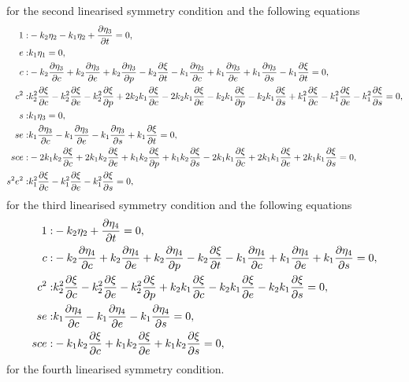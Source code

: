 for the second linearised symmetry condition and the following equations
\begin{align}
1:&- k_{2} \eta_2 - k_{1} \eta_2 + \pdv{\eta_3}{t}=0,\\
e:&k_{1} \eta_1=0,\\
c:&- k_{2} \pdv{\eta_3}{c} + k_{2} \pdv{\eta_3}{e} + k_{2} \pdv{\eta_3}{p} - k_{2} \pdv{\xi}{t} - k_{1} \pdv{\eta_3}{c} + k_{1} \pdv{\eta_3}{e} + k_{1} \pdv{\eta_3}{s} - k_{1} \pdv{\xi}{t}=0,\\
c^{2}:&k_{2}^{2} \pdv{\xi}{c} - k_{2}^{2} \pdv{\xi}{e} - k_{2}^{2} \pdv{\xi}{p} + 2 k_{2} k_{1} \pdv{\xi}{c} - 2 k_{2} k_{1} \pdv{\xi}{e} - k_{2} k_{1} \pdv{\xi}{p} - k_{2} k_{1} \pdv{\xi}{s} + k_{1}^{2} \pdv{\xi}{c} - k_{1}^{2} \pdv{\xi}{e} - k_{1}^{2} \pdv{\xi}{s}=0,\\
s:&k_{1} \eta_3=0,\\
s e:&k_{1} \pdv{\eta_3}{c} - k_{1} \pdv{\eta_3}{e} - k_{1} \pdv{\eta_3}{s}+ k_{1} \pdv{\xi}{t}=0,\\
s c e:&- 2 k_{1} k_{2} \pdv{\xi}{c} + 2 k_{1} k_{2} \pdv{\xi}{e} + k_{1} k_{2} \pdv{\xi}{p} + k_{1} k_{2} \pdv{\xi}{s} - 2 k_{1} k_{1} \pdv{\xi}{c} + 2 k_{1} k_{1} \pdv{\xi}{e} + 2 k_{1} k_{1} \pdv{\xi}{s}=0,\\
s^{2} e^{2}:&k_{1}^{2} \pdv{\xi}{c} - k_{1}^{2} \pdv{\xi}{e} - k_{1}^{2} \pdv{\xi}{s}=0,
\end{align}
for the third linearised symmetry condition and the following equations
\begin{align}
1:&- k_{2} \eta_2+ \pdv{\eta_4}{t}=0,\\
c:&- k_{2} \pdv{\eta_4}{c} + k_{2} \pdv{\eta_4}{e} + k_{2} \pdv{\eta_4}{p} - k_{2} \pdv{\xi}{t} - k_{1} \pdv{\eta_4}{c} + k_{1} \pdv{\eta_4}{e} + k_{1} \pdv{\eta_4}{s}=0,\\
c^{2}:&k_{2}^{2} \pdv{\xi}{c} - k_{2}^{2} \pdv{\xi}{e} - k_{2}^{2} \pdv{\xi}{p} + k_{2} k_{1} \pdv{\xi}{c} - k_{2} k_{1} \pdv{\xi}{e} - k_{2} k_{1} \pdv{\xi}{s}=0,\\
s e:&k_{1} \pdv{\eta_4}{c} - k_{1} \pdv{\eta_4}{e} - k_{1} \pdv{\eta_4}{s}=0,\\
s c e:&- k_{1} k_{2} \pdv{\xi}{c} + k_{1} k_{2} \pdv{\xi}{e} + k_{1} k_{2} \pdv{\xi}{s}=0,
\end{align}
for the fourth linearised symmetry condition.